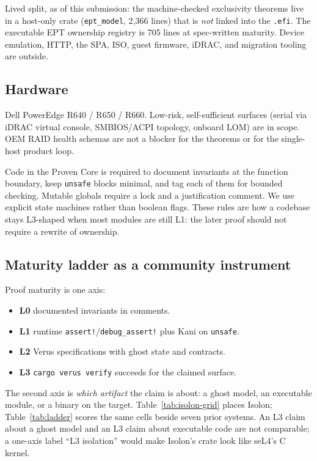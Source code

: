 \documentclass[sigplan,10pt,anonymous]{acmart}
\begin{document}
Lived split, as of this submission: the machine-checked exclusivity theorems
live in a host-only crate (\texttt{ept\_model}, 2{,}366 lines) that is
\emph{not} linked into the \texttt{.efi}. The executable EPT ownership
registry is 705 lines at spec-written maturity. Device emulation, HTTP, the
SPA, ISO, guest firmware, iDRAC, and migration tooling are outside.

\subsection{Hardware}

Dell PowerEdge R640 / R650 / R660. Low-risk, self-sufficient surfaces (serial
via iDRAC virtual console, SMBIOS/ACPI topology, onboard LOM) are in
scope. OEM RAID health schemas are not a blocker for the theorems or for
the single-host product loop.

Code in the Proven Core is required to document invariants at the function
boundary, keep \texttt{unsafe} blocks minimal, and tag each of them for
bounded checking. Mutable globals require a lock and a justification
comment. We use explicit state machines rather than boolean flags. These
rules are how a codebase stays L3-shaped when most modules are still L1:
the later proof should not require a rewrite of ownership.

\subsection{Maturity ladder as a community instrument}
\label{sec:ladder}

Proof maturity is one axis:

\begin{itemize}
\item \textbf{L0} documented invariants in comments.
\item \textbf{L1} runtime \texttt{assert!}/\texttt{debug\_assert!} plus Kani
  on \texttt{unsafe}.
\item \textbf{L2} Verus specifications with ghost state and contracts.
\item \textbf{L3} \texttt{cargo verus verify} succeeds for the claimed
  surface.
\end{itemize}

The second axis is \emph{which artifact} the claim is about: a ghost
model, an executable module, or a binary on the target. Table~\ref{tab:isolon-grid}
places Isolon; Table~\ref{tab:ladder} scores the same cells beside seven
prior systems. An L3 claim about a ghost model and an L3 claim about
executable code are not comparable; a one-axis label ``L3 isolation''
would make Isolon's crate look like seL4's C kernel.
\end{document}
